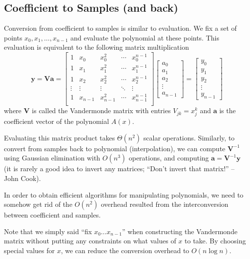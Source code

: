 \subsection{Coefficient to Samples (and back)}

Conversion from coefficient to samples is similar to evaluation. We fix a set of points $x_0,x_1,\ldots,x_{n-1}$ and evaluate the polynomial at these points. This evaluation is equivalent to the following matrix multiplication
$$
\mathbf{y} = \mathbf{V} \mathbf{a} =
\begin{bmatrix}
1 & x_0 & x_0^2 & \cdots & x_0^{n-1} \\
1 & x_1 & x_1^2 & \cdots & x_1^{n-1} \\
1 & x_2 & x_2^2 & \cdots & x_2^{n-1} \\
\vdots & \vdots & \vdots & \ddots & \vdots \\
1 & x_{n-1} & x_{n-1}^2 & \cdots & x_{n-1}^{n-1} \\
\end{bmatrix}
\begin{bmatrix} 
    a_0 \\
    a_1 \\
    a_2 \\
    \vdots \\
    a_{n-1}
\end{bmatrix} =
\begin{bmatrix} 
    y_0 \\
    y_1 \\
    y_2 \\
    \vdots \\
    y_{n-1}
\end{bmatrix} 
$$
where $\mathbf{V}$ is called the Vandermonde matrix with entries $V_{jk} = x_j^k$ and $\mathbf{a}$ is the coefficient vector of the polynomial $A(x)$.

Evaluating this matrix product takes $\Theta(n^2)$ scalar operations. Similarly, to convert from samples back to polynomial (interpolation), we can compute $\mathbf{V}^{-1}$ using Gaussian elimination with $O(n^3)$ operations, and computing $\mathbf{a} = \mathbf{V}^{-1}\mathbf{y}$ (it is rarely a good idea to invert any matrices; ``Don't invert that matrix!'' -- John Cook).

In order to obtain efficient algorithms for manipulating polynomials, we need to somehow get rid of the $O(n^2)$ overhead resulted from the interconversion between coefficient and samples.

Note that we simply said ``fix $x_0\ldots x_{n-1}$'' when constructing the Vandermonde matrix without putting any constraints on what values of $x$ to take. By choosing special values for $x$, we can reduce the conversion overhead to $O(n \log n)$.

